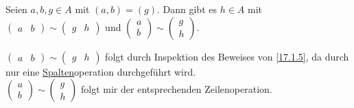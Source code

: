 \documentclass[../../main.tex]{subfiles}
\begin{document}
\begin{lem}\label{17.1.8}
Seien $a,b,g\in A$ mit $(a,b)=(g)$. Dann gibt es $h\in A$ mit $\begin{pmatrix*}a&b\end{pmatrix*}\sim \begin{pmatrix*}g&h\end{pmatrix*}$ und $\begin{pmatrix*}a\\b\end{pmatrix*}\sim \begin{pmatrix*}g\\h\end{pmatrix*}$.
\end{lem}
\begin{cproof}
$\begin{pmatrix*}a&b\end{pmatrix*}\sim \begin{pmatrix*}g&h\end{pmatrix*}$ folgt durch Inspektion des Beweises von \ref{17.1.5}, da durch nur eine \underline{Spalten}operation durchgeführt wird.\\
$\begin{pmatrix*}a\\b\end{pmatrix*}\sim \begin{pmatrix*}g\\h\end{pmatrix*}$ folgt mir der entsprechenden Zeilenoperation.
\end{cproof}
\end{document}
